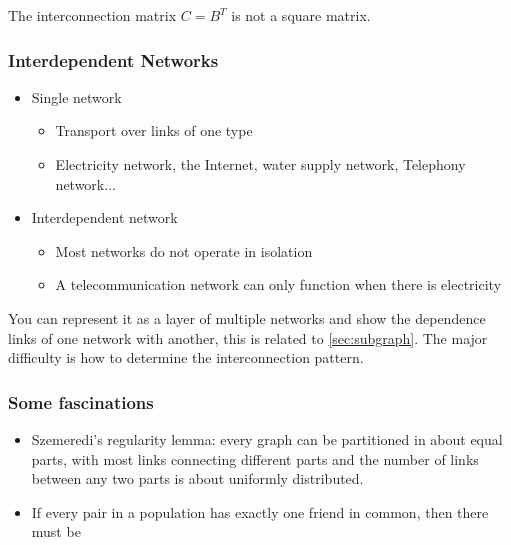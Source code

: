 The interconnection matrix $C = B^T$ is not a square matrix.

\subsubsection{Interdependent Networks}
\begin{itemize}
  \item Single network
  \begin{itemize}
    \item Transport over links of one type
    \item Electricity network, the Internet, water supply network, Telephony network...
  \end{itemize}
  \item Interdependent network
  \begin{itemize}
    \item Most networks do not operate in isolation
    \item A telecommunication network can only function when there is electricity
  \end{itemize}
\end{itemize}

You can represent it as a layer of multiple networks and show the dependence links of one network
with another, this is related to \autoref{sec:subgraph}. The major difficulty is how to determine
the interconnection pattern.

\subsubsection{Some fascinations}
\begin{itemize}
  \item Szemeredi's regularity lemma: every graph can be partitioned in about equal parts,
  with most links connecting different parts and the number of links between any two parts is about
  uniformly distributed.
  \item If every pair in a population has exactly one friend in common, then there must be
\end{itemize}






